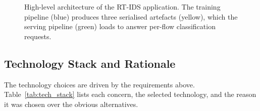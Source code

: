 \begin{figure}[htbp]
{%
    }
    \caption{High-level architecture of the RT-IDS application. The training pipeline (blue) produces three serialised artefacts (yellow), which the serving pipeline (green) loads to answer per-flow classification requests.}
    \label{fig:system_architecture}
\end{figure}

\subsection{Technology Stack and Rationale}
\label{subsec:tech_stack}

\par The technology choices are driven by the requirements above. Table~\ref{tab:tech_stack} lists each concern, the selected technology, and the reason it was chosen over the obvious alternatives.

